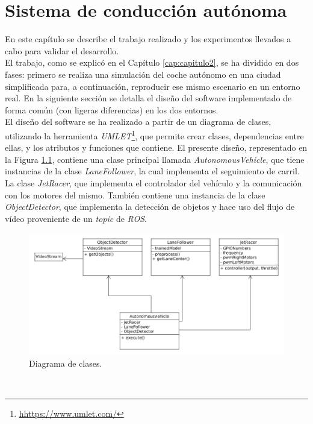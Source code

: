 \chapter{Sistema de conducción autónoma}
\label{cap:capitulo4}
En este capítulo se describe el trabajo realizado y los experimentos llevados a cabo para validar el desarrollo.\\

El trabajo, como se explicó en el Capítulo \ref{cap:capitulo2}, se ha dividido en dos fases: primero se realiza una simulación del coche autónomo en una ciudad simplificada para, a continuación, reproducir ese mismo escenario en un entorno real. En la siguiente sección se detalla el diseño del software implementado de forma común (con ligeras diferencias) en los dos entornos.\\

El diseño del software se ha realizado a partir de un diagrama de clases, utilizando la herramienta \textit{UMLET}\footnote{\url{hhttps://www.umlet.com/}}, que permite crear clases, dependencias entre ellas, y los atributos y funciones que contiene. El presente diseño, representado en la Figura \ref{fig:diagram}, contiene una clase principal llamada \textit{AutonomousVehicle}, que tiene instancias de la clase \textit{LaneFollower}, la cual implementa el seguimiento de carril. La clase \textit{JetRacer}, que implementa el controlador del vehículo y la comunicación con los motores del mismo. También contiene una instancia de la clase \textit{ObjectDetector}, que implementa la detección de objetos y hace uso del flujo de vídeo proveniente de un \textit{topic} de \textit{ROS}.
\begin{figure} [h!]
	\begin{center}
		\includegraphics[width=16cm]{figs/diagram5}
	\end{center}
	\caption{Diagrama de clases.}
	\label{fig:diagram}
\end{figure}\

